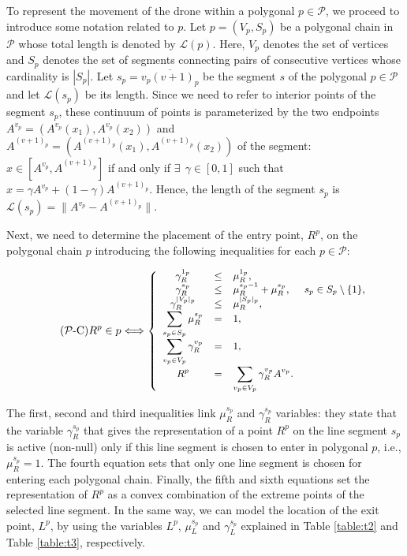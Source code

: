 To represent the movement of the drone within a polygonal $p\in\mathcal P$, we proceed to introduce some notation related to $p$.
Let $p = (V_p, S_p)$ be a polygonal chain in $\mathcal P$ whose total length is denoted by $\mathcal L(p)$. Here, $V_p$ denotes the set of vertices and $S_p$ denotes the set of segments connecting pairs of consecutive vertices whose cardinality is $|S_p|$. Let $s_p=\overline{v_p(v+1)_p}$ be the segment $s$ of the polygonal $p \in \mathcal P$ and let $\mathcal  L(s_p)$ be its length. Since we need to refer to interior points of the segment $s_p$, these continuum of points is parameterized by the two endpoints $A^{v_p}= (A^{v_p}(x_1), A^{v_p}(x_2))$ and $A^{(v+1)_p}= (A^{(v+1)_p}(x_1), A^{(v+1)_p}(x_2))$ of the segment: $x\in[A^{v_p}, A^{(v+1)_p}]$ if and only if $\exists \:\: \gamma\in[0, 1]$ such that $x=\gamma A^{v_p} + (1-\gamma)A^{(v+1)_p}$. Hence, the length of the segment $s_p$ is $\mathcal L(s_p) =\|A^{v_p} -  A^{(v+1)_p}\|$.

Next, we need to determine the placement of the entry point, $R^p$, on the polygonal chain $p$ introducing the following inequalities for each $p\in\mathcal P$:

\begin{equation}\label{P-C}\tag{$\mathcal P$-C}
\small
 R^p\in p \Longleftrightarrow
 \left\{
 \begin{array}{cclr}
 \gamma_R^{1_p}                     & \leq & \mu_R^{1_p},                                  & \\
 \gamma_R^{s_p}                     & \leq & \mu_R^{s_p-1} + \mu_R^{s_p}, & s_p\in S_p \setminus\{1\},\\
 \gamma_R^{|V_p|_p}             & \leq & \mu_R^{|S_p|_p}, \\
 \displaystyle\sum_{s_p\in S_p} \mu_R^{s_p}      &   =  & 1, & \\
 \displaystyle\sum_{v_p\in V_p} \gamma_R^{v_p}   &   =  & 1, & \\
  R^p                               & = & \displaystyle\sum_{v_p\in V_p}\gamma_R^{v_p}A^{v_p}. & \\
 \end{array}
 \right.
\end{equation}

The first, second and third inequalities link $\mu_R^{s_p}$ and $\gamma_R^{s_p}$ variables: they state that the variable $\gamma_R^{s_p}$ that gives the representation of a point $R^p$ on the line segment $s_p$ is active (non-null) only if this line segment is chosen to enter in polygonal $p$, i.e., $\mu_R^{s_p}=1$. The fourth equation sets that only one line segment is chosen for entering each polygonal chain. Finally, the fifth and sixth equations set the representation of $R^p$ as a convex combination of the extreme points of the selected line segment.
In the same way, we can model the location of the exit point, $L^p$, by using the variables $L^p$, $\mu_L^{s_p}$ and $\gamma_L^{s_p}$ explained in Table \ref{table:t2} and Table \ref{table:t3}, respectively.

